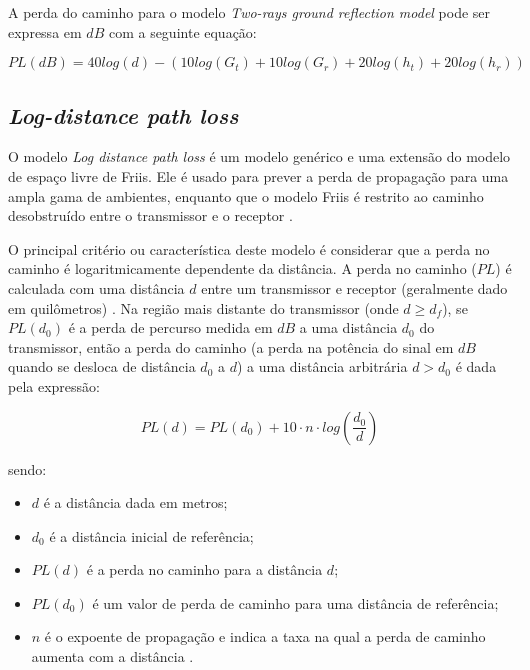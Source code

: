 \documentclass[
	12pt,				%
	twoside,			%
	a4paper,			%
	english,			%
	french,				%
	spanish,			%
	brazil				%
	]{abntex2}
\begin{document}
A perda do caminho para o modelo \emph{Two-rays ground reflection model}
pode ser expressa em \(dB\) com a seguinte equação:

\begin{equation}
PL(dB) = 40 log (d) -(10 log (G_{t}) + 10 log (G_{r}) + 20 log (h_{t}) + 20 log (h_{r}))
\end{equation}

\subsection{\texorpdfstring{\emph{Log-distance path
loss}}{Log-distance path loss}}\label{sec:log_distance}

O modelo \emph{Log distance path loss} é um modelo genérico e uma
extensão do modelo de espaço livre de Friis. Ele é usado para prever a
perda de propagação para uma ampla gama de ambientes, enquanto que o
modelo Friis é restrito ao caminho desobstruído entre o transmissor e o
receptor \cite{LUO}.

O principal critério ou característica deste modelo é considerar que a
perda no caminho é logaritmicamente dependente da distância. A perda no
caminho (\(PL\)) é calculada com uma distância \(d\) entre um
transmissor e receptor (geralmente dado em quilômetros) . Na região mais
distante do transmissor (onde \(d \geq d_{f}\)), se \(PL(d_{0})\) é a
perda de percurso medida em \(dB\) a uma distância \(d_{0}\) do
transmissor, então a perda do caminho (a perda na potência do sinal em
\(dB\) quando se desloca de distância \(d_{0}\) a \(d\)) a uma distância
arbitrária \(d > d_{0}\) é dada pela expressão:

\begin{equation}
PL(d) = PL(d_{0}) + 10 \cdot n \cdot log(\frac{d_{0}}{d})
\end{equation}

sendo:

\begin{itemize}
\item
  \(d\) é a distância dada em metros;
\item
  \(d_{0}\) é a distância inicial de referência;
\item
  \(PL(d)\) é a perda no caminho para a distância \(d\);
\item
  \(PL(d_{0})\) é um valor de perda de caminho para uma distância de
  referência;
\item
  \(n\) é o expoente de propagação e indica a taxa na qual a perda de
  caminho aumenta com a distância \cite{MATHURANATHAN}.
\end{itemize}
\end{document}
